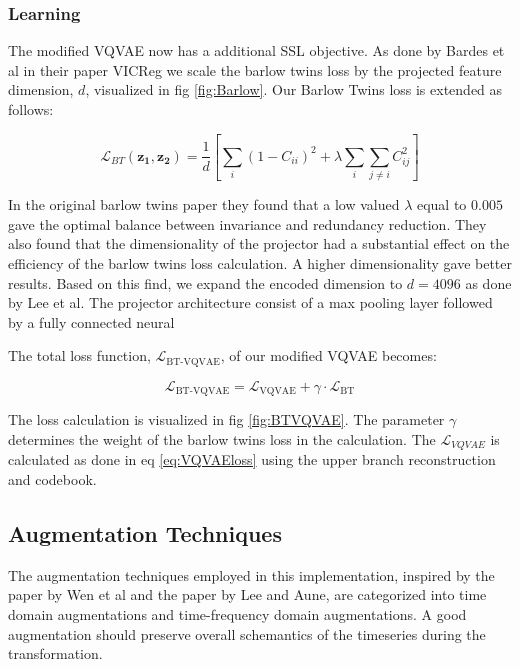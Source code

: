 \subsubsection{Learning}
The modified VQVAE now has a additional SSL objective. As done by Bardes et al in their paper VICReg\cite{VICReg} we scale the barlow twins loss by the projected feature dimension, $d$, visualized in fig \ref{fig:Barlow}. Our Barlow Twins loss is extended as follows:

\begin{equation}
\mathcal{L}_{BT}(\mathbf{z_1}, \mathbf{z_2}) =\frac{1}{d} \left[ \sum_i (1 - C_{ii})^2 + \lambda \sum_i \sum_{j \neq i} C_{ij}^2\right]
\end{equation}

In the original barlow twins paper\cite{Barlow} they found that a low valued $\lambda$ equal to $0.005$ gave the optimal balance between invariance and redundancy reduction. They also found that the dimensionality of the projector had a substantial effect on the 
efficiency of the barlow twins loss calculation. A higher dimensionality gave better results. Based on this find, we expand the encoded dimension to $d=4096$ as done by Lee et al\cite{SSLs}. 
The projector architecture consist of a max pooling layer followed by a fully connected neural

The total loss function, $\mathcal{L}_{\text{BT-VQVAE}}$, of our modified VQVAE becomes:

\begin{equation}
    \mathcal{L}_{\text{BT-VQVAE}} = \mathcal{L}_{\text{VQVAE}} + \gamma \cdot \mathcal{L}_\text{BT}
    \label{eq:BTVQVAEloss}
\end{equation}

The loss calculation is visualized in fig \ref{fig:BTVQVAE}. The parameter $\gamma$ determines the weight of the barlow twins loss in the calculation. The $\mathcal{L}_{VQVAE}$ is calculated as done in eq \ref{eq:VQVAEloss} using the upper branch reconstruction and codebook.

\subsection{Augmentation Techniques}
The augmentation techniques employed in this implementation, inspired by the paper by Wen et al\cite{augs} and the paper by Lee and Aune\cite{SSLs}, are categorized into time domain augmentations and time-frequency domain augmentations. 
A good augmentation should preserve overall schemantics of the timeseries during the transformation. 

